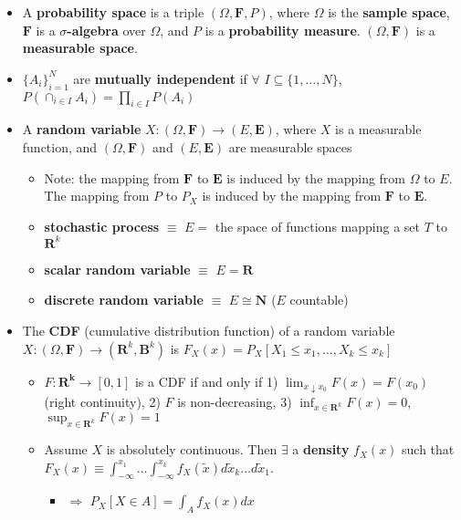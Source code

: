 \documentclass[12pt,english]{article}
\begin{document}
\begin{itemize}
	\item A \textbf{probability space} is a triple $(\Omega, \textbf{F}, P)$, where $\Omega$ is the \textbf{sample space}, $\textbf{F}$ is a \textbf{$\sigma$-algebra} over $\Omega$, and $P$ is a \textbf{probability measure}. $(\Omega, \textbf{F})$ is a \textbf{measurable space}.
	\item $\{ A_{i} \}_{i = 1}^{N}$ are \textbf{mutually independent} if $\forall$ $I \subseteq \{1, \ldots, N\}$, $P(\cap_{i \in I} A_{i}) = \prod_{i \in I} P(A_{i})$
	\item A \textbf{random variable} $X : (\Omega, \mathbf{F}) \to (E, \mathbf{E})$, where $X$ is a measurable function, and $(\Omega, \mathbf{F})$ and $(E, \mathbf{E})$ are measurable spaces
	\begin{itemize}
		\item Note: the mapping from $\mathbf{F}$ to $\mathbf{E}$ is induced by the mapping from $\Omega$ to $E$. The mapping from $P$ to $P_{X}$ is induced by the mapping from $\mathbf{F}$ to $\mathbf{E}$.
		\item \textbf{stochastic process} $\equiv$ $E = $ the space of functions mapping a set $T$ to $\mathbf{R}^{k}$
		\item \textbf{scalar random variable} $\equiv$ $E = \mathbf{R}$
		\item \textbf{discrete random variable} $\equiv$ $E \cong \mathbf{N}$ ($E$ countable)
	\end{itemize}
	\item The \textbf{CDF} (cumulative distribution function) of a random variable $X : (\Omega, \textbf{F}) \to (\mathbf{R}^{k}, \mathbf{B}^{k})$ is $F_{X}(x) = P_{X}[X_{1} \leq x_{1}, \ldots, X_{k} \leq x_{k}]$
	\begin{itemize}
		\item $F : \mathbf{R^{k}} \to [0, 1]$ is a CDF if and only if 1) $\lim_{x \downarrow x_{0}} F(x) = F(x_{0})$ (right continuity), 2) $F$ is non-decreasing, 3) $\inf_{x \in \mathbf{R}^{k}} F(x) = 0$, $\sup_{x \in \mathbf{R}^{k}} F(x) = 1$
		\item Assume $X$ is absolutely continuous. Then $\exists$ a \textbf{density} $f_{X}(x)$ such that $F_{X}(x) \equiv \int_{-\infty}^{x_{1}} \ldots \int_{-\infty}^{x_{k}} f_{X}(\widetilde{x}) d\widetilde{x}_{k} \ldots d\widetilde{x}_{1}$.
		\begin{itemize}
			\item $\Rightarrow$ $P_{X}[X \in A] = \int_{A} f_{X}(x) dx$
		\end{itemize}

\end{itemize}
\end{itemize}
\end{document}

